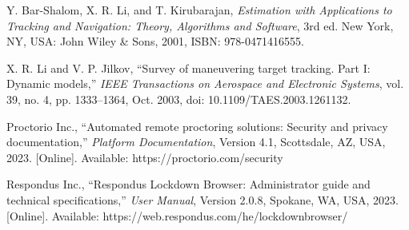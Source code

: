 \documentclass[conference]{IEEEtran}
\begin{document}
\begin{thebibliography}{99}
Y. Bar-Shalom, X. R. Li, and T. Kirubarajan, \textit{Estimation with Applications to Tracking and Navigation: Theory, Algorithms and Software}, 3rd ed. New York, NY, USA: John Wiley \& Sons, 2001, ISBN: 978-0471416555.

X. R. Li and V. P. Jilkov, ``Survey of maneuvering target tracking. Part I: Dynamic models,'' \textit{IEEE Transactions on Aerospace and Electronic Systems}, vol. 39, no. 4, pp. 1333--1364, Oct. 2003, doi: 10.1109/TAES.2003.1261132.

Proctorio Inc., ``Automated remote proctoring solutions: Security and privacy documentation,'' \textit{Platform Documentation}, Version 4.1, Scottsdale, AZ, USA, 2023. [Online]. Available: https://proctorio.com/security

Respondus Inc., ``Respondus Lockdown Browser: Administrator guide and technical specifications,'' \textit{User Manual}, Version 2.0.8, Spokane, WA, USA, 2023. [Online]. Available: https://web.respondus.com/he/lockdownbrowser/

\end{thebibliography}
\end{document}
